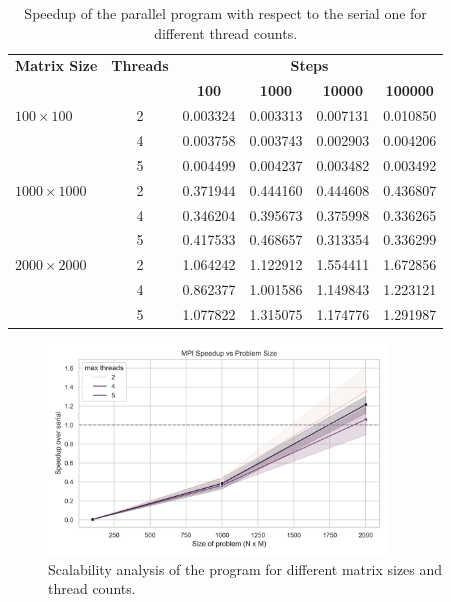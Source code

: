 \documentclass[12pt]{article}
\begin{document}
\begin{table}[h!]
	\centering
	\begin{tabular}{lccccc}
		\hline
		\textbf{Matrix Size} & \textbf{Threads} & \multicolumn{4}{c}{\textbf{Steps}}                                                    \\
		\cline{3-6}
		                     &                  & \textbf{100}                       & \textbf{1000} & \textbf{10000} & \textbf{100000} \\
		\hline
		$100\times 100$      & 2                & 0.003324                           & 0.003313      & 0.007131       & 0.010850        \\
		                     & 4                & 0.003758                           & 0.003743      & 0.002903       & 0.004206        \\
		                     & 5                & 0.004499                           & 0.004237      & 0.003482       & 0.003492        \\
		$1000\times 1000$    & 2                & 0.371944                           & 0.444160      & 0.444608       & 0.436807        \\
		                     & 4                & 0.346204                           & 0.395673      & 0.375998       & 0.336265        \\
		                     & 5                & 0.417533                           & 0.468657      & 0.313354       & 0.336299        \\
		$2000\times 2000$    & 2                & 1.064242                           & 1.122912      & 1.554411       & 1.672856        \\
		                     & 4                & 0.862377                           & 1.001586      & 1.149843       & 1.223121        \\
		                     & 5                & 1.077822                           & 1.315075      & 1.174776       & 1.291987        \\
		\hline
	\end{tabular}
	\caption{Speedup of the parallel program with respect to the serial one for different thread counts.}
	\label{tab:speedup}
\end{table}


\begin{figure}[h!]
	\centering
	\includegraphics[width=0.8\textwidth]{mpi_speedup.png}
	\caption{Scalability analysis of the program for different matrix sizes and thread counts.}
	\label{fig:scalability_plot}
\end{figure}
\end{document}
